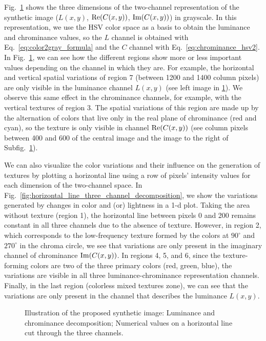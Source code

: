 Fig.\ \ref{fig:three_channel_decomposition} shows the three dimensions of the two-channel representation of the synthetic image ($L(x,y)$, $\mathrm{Re}(C(x,y))$, $\mathrm{Im}(C(x,y))$) in grayscale. In this representation, we use the HSV color space as a basis to obtain the luminance and chrominance values, so the $L$ channel is obtained with Eq.\ \eqref{eq:color2gray_formula} and the $C$ channel with Eq.\ \eqref{eq:chrominance_hsv2}. In Fig.\ \ref{fig:three_channel_decomposition}, we can see how the different regions show more or less important values depending on the channel in which they are. For example, the horizontal and vertical spatial variations of region 7 (between 1200 and 1400 column pixels) are only visible in the luminance channel $L(x,y)$ (see left image in \ref{fig:three_channel_decomposition}). We observe this same effect in the chrominance channels, for example, with the vertical textures of region 3. The spatial variations of this region are made up by the alternation of colors that live only in the real plane of chrominance (red and cyan), so the texture is only visible in channel $\mathrm{Re}(C(x,y))$ (see column pixels between 400 and 600 of the central image and the image to the right of Subfig.\ \ref{fig:three_channel_decomposition}). 

We can also visualize the color variations and their influence on the generation of textures by plotting a horizontal line using a row of pixels' intensity values for each dimension of the two-channel space. In Fig.\ \ref{fig:horizontal_line_three_channel_decomposition}, we show the variations generated by changes in color and (or) lightness in a 1-d plot. Taking the area without texture (region 1), the horizontal line between pixels 0 and 200 remains constant in all three channels due to the absence of texture. However, in region 2, which corresponds to the low-frequency texture formed by the colors at $90^\circ$ and $270^\circ$ in the chroma circle, we see that variations are only present in the imaginary channel of chrominance $\mathrm{Im}(C(x,y))$. In regions 4, 5, and 6, since the texture-forming colors are two of the three primary colors (red, green, blue), the variations are visible in all three luminance-chrominance representation channels. Finally, in the last region (colorless mixed textures zone), we can see that the variations are only present in the channel that describes the luminance $L(x,y)$.

\begin{figure}[!ht]
\centering
\caption{Illustration of the proposed synthetic image:  Luminance and chrominance decomposition;  Numerical values on a horizontal line cut through the three channels.}\label{fig:three_channel_decomposition}
\end{figure}



